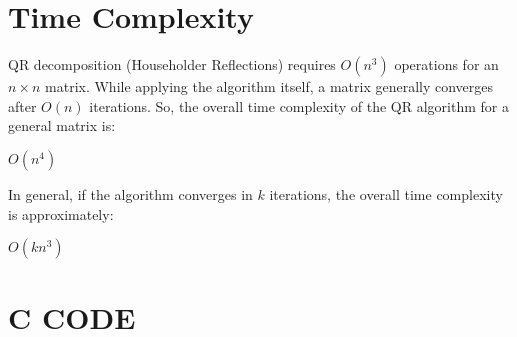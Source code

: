 \documentclass[journal]{IEEEtran}
\begin{document}
\section*{Time Complexity}
QR decomposition (Householder Reflections) requires $O(n^3)$ operations for an $ n \times n $ matrix. While applying the algorithm itself, a matrix generally converges after $ O(n)$ iterations. So, the overall time complexity of the QR algorithm for a general matrix is:
\begin{center}
    $O(n^4)$
\end{center}
In general, if the algorithm converges in $k$ iterations, the overall time complexity is approximately:
\begin{center}
    $O(kn^3)$
\end{center}
\section{\textbf{C CODE}}
\end{document}
